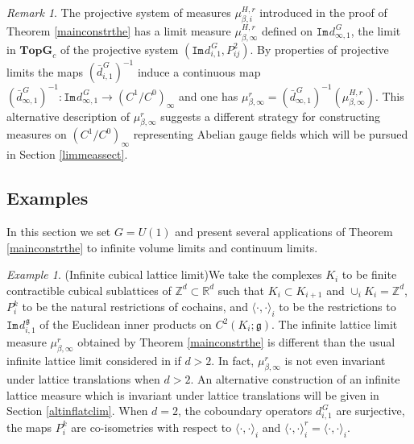 \documentclass[11pt,reqno]{amsart}
\numberwithin{equation}{section}
\theoremstyle{remark}
\newtheorem{remark}[theorem]{Remark}
\newtheorem{example}[theorem]{Example}
\theoremstyle{rmdefinition}
\begin{document}
\begin{remark}
The projective system of measures $\mu^{H,r}_{\beta,i}$ introduced in the proof of Theorem \ref{mainconstrthe} has a limit measure $\mu^{H,r}_{\beta,\infty}$ defined on $\mathtt{Im}\hspace{1pt}d_{\infty,1}^{\hspace{1pt}G}$, the limit in $\mathbf{TopG}_c$ of the projective system $(\mathtt{Im}\hspace{1pt}d_{i,1}^{\hspace{1pt}G},P^2_{ij})$. 
By properties of projective limits the maps $(\bar{d}^{\hspace{1pt}G}_{i,1})^{-1}$  induce a continuous map $(\bar{d}^{\hspace{1pt}G}_{\infty,1})^{-1}: \mathtt{Im}\hspace{1pt}d_{\infty,1}^{\hspace{1pt}G} \to (C^1/C^0)_\infty$ and one has $\mu^r_{\beta,\infty}=(\bar{d}^{\hspace{1pt}G}_{\infty,1})^{-1}(\mu^{H,r}_{\beta,\infty})$. This alternative description of $\mu^r_{\beta,\infty}$ suggests a different strategy for constructing measures on $(C^1/C^0)_\infty$  representing Abelian gauge fields which will be pursued in Section \ref{limmeassect}.
\end{remark}

\subsection{Examples}
In this section we set $G=U(1)$ and present several applications of Theorem \ref{mainconstrthe} to infinite volume limits and continuum limits.

\begin{example}(Infinite cubical lattice limit)\label{exinfculat}
We take the complexes $K_i$ to be finite contractible cubical sublattices of $\mathbb{Z}^d \subset \mathbb{R}^d$ such that $K_i \subset K_{i+1}$ and $\cup_i K_i=\mathbb{Z}^d$, $P_i^k$ to be the natural restrictions of cochains, and $\langle \cdot, \cdot \rangle_i$ to be the restrictions to  $\mathtt{Im}\hspace{1pt}d_{i,1}^{\hspace{1pt}\mathfrak g}$ of the Euclidean inner products on $C^2(K_i;\mathfrak g)$. The infinite lattice limit measure $\mu^r_{\beta,\infty}$ obtained by Theorem \ref{mainconstrthe} is  different than the usual infinite lattice limit considered in \cite{FS} if $d>2$. In fact, $\mu^r_{\beta,\infty}$ is not even invariant under lattice translations when $d>2$. An alternative construction of an infinite lattice measure which is invariant under lattice translations will be given in Section \ref{altinflatclim}. When $d=2$, the coboundary operators $d^{\hspace{1pt}G}_{i,1}$  are surjective, the maps $P_i^k$ are co-isometries with respect to $\langle \cdot, \cdot \rangle_i$ and $\langle \cdot, \cdot \rangle^r_i=\langle \cdot, \cdot \rangle_i$.
\end{example}
\end{document}
